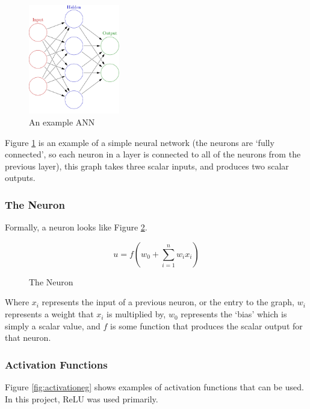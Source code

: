     \begin{figure}[h]
        \centering
        \includegraphics[width=150px]{../img/1000px-Colored_neural_network.png}
        \caption[]{An example ANN\protect\footnotemark}
        \label{fig:fcneuralnet}
    \end{figure}
    
    Figure \ref{fig:fcneuralnet} is an example of a simple neural network (the neurons are `fully connected', so each neuron in a layer is connected to all of the neurons from the previous layer), this graph takes three scalar inputs, and produces two scalar outputs.
    
        \subsubsection{The Neuron}
        Formally, a neuron looks like Figure \ref{fig:theneuron}.
        \begin{figure}[h]
        \[
            u=f(w_0+\sum_{i=1}^nw_ix_i)
        \]
        \caption{The Neuron}
        \label{fig:theneuron}
        \end{figure}
        
        Where $x_i$ represents the input of a previous neuron, or the entry to the graph, $w_i$ represents a weight that $x_i$ is multiplied by, $w_0$ represents the `bias' which is simply a scalar value, and $f$ is some function that produces the scalar output for that neuron.
        
        \subsubsection{Activation Functions}
        Figure \ref{fig:activationeg} shows examples of activation functions that can be used. In this project, ReLU was used primarily.\\

